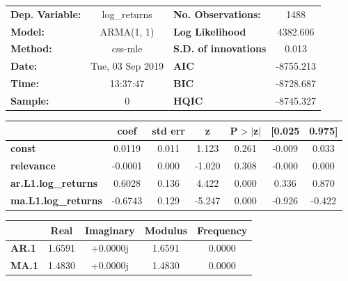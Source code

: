 \begin{center}
\begin{tabular}{lclc}
\toprule
\textbf{Dep. Variable:}     &        log\_returns       & \textbf{  No. Observations:  } &            1488            \\
\textbf{Model:}             &         ARMA(1, 1)        & \textbf{  Log Likelihood     } &          4382.606          \\
\textbf{Method:}            &          css-mle          & \textbf{  S.D. of innovations} &           0.013            \\
\textbf{Date:}              &      Tue, 03 Sep 2019     & \textbf{  AIC                } &         -8755.213          \\
\textbf{Time:}              &          13:37:47         & \textbf{  BIC                } &         -8728.687          \\
\textbf{Sample:}            &             0             & \textbf{  HQIC               } &         -8745.327          \\
\bottomrule
\end{tabular}
\begin{tabular}{lcccccc}
                            & \textbf{coef} & \textbf{std err} & \textbf{z} & \textbf{P$> |$z$|$} & \textbf{[0.025} & \textbf{0.975]}  \\
\midrule
\textbf{const}              &       0.0119  &        0.011     &     1.123  &         0.261        &       -0.009    &        0.033     \\
\textbf{relevance}          &      -0.0001  &        0.000     &    -1.020  &         0.308        &       -0.000    &        0.000     \\
\textbf{ar.L1.log\_returns} &       0.6028  &        0.136     &     4.422  &         0.000        &        0.336    &        0.870     \\
\textbf{ma.L1.log\_returns} &      -0.6743  &        0.129     &    -5.247  &         0.000        &       -0.926    &       -0.422     \\
\bottomrule
\end{tabular}
\begin{tabular}{lcccc}
              & \textbf{            Real} & \textbf{         Imaginary} & \textbf{         Modulus} & \textbf{        Frequency}  \\
\midrule
\textbf{AR.1} &                1.6591     &                +0.0000j     &                1.6591     &                0.0000       \\
\textbf{MA.1} &                1.4830     &                +0.0000j     &                1.4830     &                0.0000       \\
\bottomrule
\end{tabular}
\end{center}
